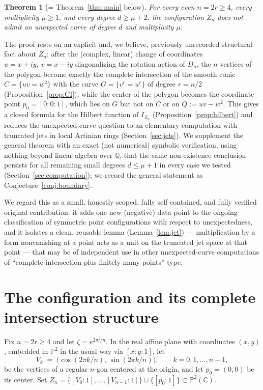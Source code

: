 \documentclass[11pt]{amsart}
\theoremstyle{plain}
\newtheorem*{theorem*}{Theorem}
\theoremstyle{definition}
\newcommand{\PP}{\mathbb{P}}
\newcommand{\CC}{\mathbb{C}}
\newcommand{\QQ}{\mathbb{Q}}
\begin{document}
\begin{theorem*}[= Theorem~\ref{thm:main} below]
For every even $n=2r\ge4$, every multiplicity $\mu\ge1$, and every degree $d\ge \mu+2$, the configuration $Z_n$ does \emph{not} admit an unexpected curve of degree $d$ and multiplicity $\mu$.
\end{theorem*}

The proof rests on an explicit and, we believe, previously unrecorded structural fact about $Z_n$: after the (complex, linear) change of coordinates $u=x+iy,\ v=x-iy$ diagonalizing the rotation action of $D_n$, the $n$ vertices of the polygon become exactly the complete intersection of the smooth conic $C=\{uv=w^2\}$ with the curve $G=\{v^r=u^r\}$ of degree $r=n/2$ (Proposition~\ref{prop:CI}), while the center of the polygon becomes the coordinate point $p_0=[0:0:1]$, which lies on $G$ but not on $C$ or on $Q:=uv-w^2$. This gives a closed formula for the Hilbert function of $I_{Z_n}$ (Proposition~\ref{prop:hilbert}) and reduces the unexpected-curve question to an elementary computation with truncated jets in local Artinian rings (Section~\ref{sec:jets}). We supplement the general theorem with an exact (not numerical) symbolic verification, using nothing beyond linear algebra over $\QQ$, that the same non-existence conclusion persists for all remaining small degrees $d\le\mu+1$ in every case we tested (Section~\ref{sec:computation}); we record the general statement as Conjecture~\ref{conj:boundary}.

We regard this as a small, honestly-scoped, fully self-contained, and fully verified original contribution: it adds one new (negative) data point to the ongoing classification of symmetric point configurations with respect to unexpectedness, and it isolates a clean, reusable lemma (Lemma~\ref{lem:jet}) --- multiplication by a form nonvanishing at a point acts as a unit on the truncated jet space at that point --- that may be of independent use in other unexpected-curve computations of ``complete intersection plus finitely many points'' type.

\section{The configuration and its complete intersection structure}\label{sec:CI}

Fix $n=2r\ge4$ and let $\zeta=e^{2\pi i/n}$. In the real affine plane with coordinates $(x,y)$, embedded in $\PP^2$ in the usual way via $[x:y:1]$, let
\[
V_k \;=\; \big(\cos(2\pi k/n),\,\sin(2\pi k/n)\big), \qquad k=0,1,\dots,n-1,
\]
be the vertices of a regular $n$-gon centered at the origin, and let $p_0=(0,0)$ be its center. Set $Z_n=\{[V_0:1],\dots,[V_{n-1}:1]\}\cup\{[p_0:1]\}\subset\PP^2(\CC)$.
\end{document}
